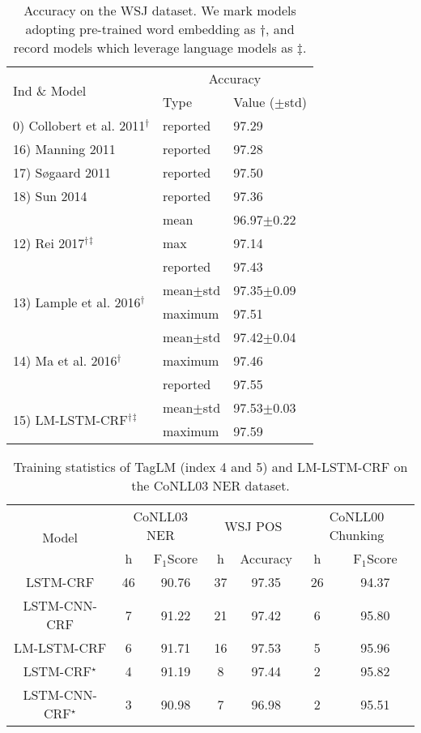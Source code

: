 \documentclass[letterpaper]{article} \usepackage{aaai18}  \usepackage{times}  \usepackage{helvet}  \usepackage{courier}  \usepackage{url}  \usepackage{graphicx}  \usepackage{multirow}
\newcommand{\our}{\textsc{LM-LSTM-CRF}\xspace}
\begin{document}
\begin{table}
\center
\scalebox{0.9}
{
\begin{tabular}{l||l|l}
\hline
\multirow{2}{*}{Ind \& Model} & \multicolumn{2}{|c}{Accuracy}\\
\cline{2-3}
& Type & Value ($\pm$std)\\
\hline
\hline
0) Collobert et al. 2011$^\dagger$ & reported& 97.29\\
\hline
16) Manning 2011 & reported & 97.28 \\
\hline
17) \nocite{sogaard2011semisupervised} S{\o}gaard 2011& reported& 97.50\\
\hline
18) \nocite{sun2014structure} Sun 2014 & reported& 97.36 \\
\hline
\multirow{3}{*}{12) Rei 2017$^\dagger$$^\ddagger$} & mean & 96.97$\pm$0.22\\
\cline{2-3}
& max & 97.14\\
\cline{2-3}
& reported & 97.43\\
\hline
\multirow{2}{*}{13) Lample et al. 2016$^\dagger$} & mean$\pm$std & 97.35$\pm$0.09\\
\cline{2-3}
& maximum & 97.51\\
\hline
\multirow{3}{*}{14) Ma et al. 2016$^\dagger$} &mean$\pm$std & 97.42$\pm$0.04\\
\cline{2-3}
& maximum & 97.46\\
\cline{2-3}
& reported & 97.55\\
\hline
\multirow{2}{*}{15) \our$^\dagger$$^\ddagger$} & mean$\pm$std & 97.53$\pm$0.03\\
\cline{2-3}
& maximum & 97.59\\
\hline
\end{tabular}
}
\caption{Accuracy on the WSJ dataset.
We mark models adopting pre-trained word embedding as $\dagger$, and record models which leverage language models as $\ddagger$.
}\label{tbl:pos}
\end{table}


\begin{table}
\center
\scalebox{0.65}
{
\begin{tabular}{c||c|c||c|c||c|c}
\hline
\multirow{2}{*}{Model} & \multicolumn{2}{|c||}{CoNLL03 NER} & \multicolumn{2}{|c||}{WSJ POS} & \multicolumn{2}{|c}{CoNLL00 Chunking} \\
\cline{2-7}
& h & F$_1$Score & h & Accuracy & h & F$_1$Score\\
\hline
\hline
LSTM-CRF & 46 & 90.76 & 37 & 97.35 & 26 & 94.37 \\
\hline
LSTM-CNN-CRF & 7 & 91.22 & 21 & 97.42 & 6 & 95.80 \\
\hline
\our & 6 & 91.71 & 16 & 97.53 & 5 & 95.96 \\
\hline
LSTM-CRF$^\star$ & 4 & 91.19 & 8 & 97.44 & 2 & 95.82 \\
\hline
LSTM-CNN-CRF$^\star$ & 3 & 90.98 & 7 & 96.98 & 2 & 95.51 \\
\end{tabular}
}
\caption{Training statistics of TagLM (index 4 and 5) and \our on the CoNLL03 NER dataset.}\label{tbl:eff2}
\end{table}
\end{document}
